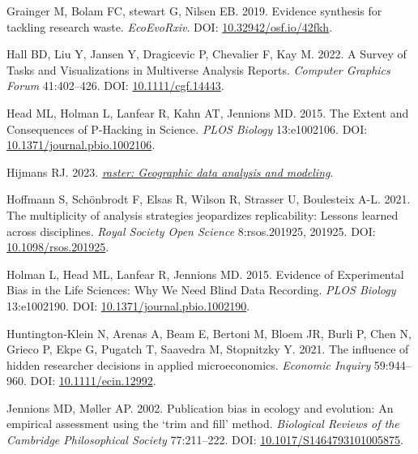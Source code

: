 \documentclass[10pt,a4paper]{article}
\newlength{\cslhangindent}
\newlength{\cslentryspacingunit} %
\newenvironment{CSLReferences}[2] %
 {%
  \setlength{\parindent}{0pt}
  \ifodd #1
  \let\oldpar\par
  \def\par{\hangindent=\cslhangindent\oldpar}
  \fi
  \setlength{\parskip}{#2\cslentryspacingunit}
 }%
 {}
\begin{document}
\begin{CSLReferences}{1}{0}
\leavevmode{}%
Grainger M, Bolam FC, stewart G, Nilsen EB. 2019. Evidence synthesis for tackling research waste. \emph{EcoEvoRxiv}. DOI: \href{https://doi.org/10.32942/osf.io/42fkh}{10.32942/osf.io/42fkh}.

\leavevmode{}%
Hall BD, Liu Y, Jansen Y, Dragicevic P, Chevalier F, Kay M. 2022. A {Survey} of {Tasks} and {Visualizations} in {Multiverse} {Analysis} {Reports}. \emph{Computer Graphics Forum} 41:402--426. DOI: \href{https://doi.org/10.1111/cgf.14443}{10.1111/cgf.14443}.

\leavevmode{}%
Head ML, Holman L, Lanfear R, Kahn AT, Jennions MD. 2015. The {Extent} and {Consequences} of {P}-{Hacking} in {Science}. \emph{PLOS Biology} 13:e1002106. DOI: \href{https://doi.org/10.1371/journal.pbio.1002106}{10.1371/journal.pbio.1002106}.

\leavevmode{}%
Hijmans RJ. 2023. \emph{\href{https://CRAN.R-project.org/package=raster}{{raster}: Geographic data analysis and modeling}}.

\leavevmode{}%
Hoffmann S, Schönbrodt F, Elsas R, Wilson R, Strasser U, Boulesteix A-L. 2021. The multiplicity of analysis strategies jeopardizes replicability: Lessons learned across disciplines. \emph{Royal Society Open Science} 8:rsos.201925, 201925. DOI: \href{https://doi.org/10.1098/rsos.201925}{10.1098/rsos.201925}.

\leavevmode{}%
Holman L, Head ML, Lanfear R, Jennions MD. 2015. Evidence of {Experimental} {Bias} in the {Life} {Sciences}: {Why} {We} {Need} {Blind} {Data} {Recording}. \emph{PLOS Biology} 13:e1002190. DOI: \href{https://doi.org/10.1371/journal.pbio.1002190}{10.1371/journal.pbio.1002190}.

\leavevmode{}%
Huntington‐Klein N, Arenas A, Beam E, Bertoni M, Bloem JR, Burli P, Chen N, Grieco P, Ekpe G, Pugatch T, Saavedra M, Stopnitzky Y. 2021. The influence of hidden researcher decisions in applied microeconomics. \emph{Economic Inquiry} 59:944--960. DOI: \href{https://doi.org/10.1111/ecin.12992}{10.1111/ecin.12992}.

\leavevmode{}%
Jennions MD, Møller AP. 2002. Publication bias in ecology and evolution: An empirical assessment using the `trim and fill' method. \emph{Biological Reviews of the Cambridge Philosophical Society} 77:211--222. DOI: \href{https://doi.org/10.1017/S1464793101005875}{10.1017/S1464793101005875}.


\end{CSLReferences}
\end{document}
